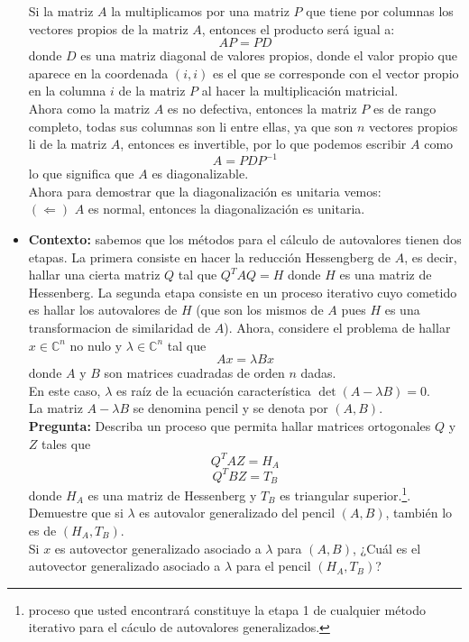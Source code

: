\documentclass{article}
\begin{document}
\begin{itemize}
Si la matriz $A$ la multiplicamos por una matriz $P$ que tiene por columnas los vectores propios de la matriz $A$, entonces el producto será igual a:
\[AP = PD\]
donde $D$ es una matriz diagonal de valores propios, donde el valor propio que aparece en la coordenada $(i,i)$ es el que se corresponde con el vector propio en la columna $i$ de la matriz $P$ al hacer la multiplicación matricial.\\

Ahora como la matriz $A$ es no defectiva, entonces la matriz $P$ es de rango completo, todas sus columnas son li entre ellas, ya que son $n$ vectores propios li de la matriz $A$, entonces es invertible, por lo que podemos escribir $A$ como 
\[A = PDP^{-1}\]
lo que significa que $A$ es diagonalizable.\\

Ahora para demostrar que la diagonalización es unitaria vemos:\\

\((\Leftarrow)\)
$A$ es normal, entonces la diagonalización es unitaria.

\item {\bf Contexto: } sabemos que los métodos para el cálculo de autovalores tienen dos etapas. La primera consiste en hacer la reducción Hessengberg de $A$, es decir, hallar una cierta matriz $Q$ tal que $Q^{T}AQ=H$ donde $H$ es una matriz de Hessenberg. La segunda etapa consiste en un proceso iterativo cuyo cometido es hallar los autovalores de $H$ (que son los mismos de $A$ pues $H$ es una transformacion de similaridad de $A$). Ahora, considere el problema de hallar $x\in \mathbb{C}^{n}$ no nulo y $\lambda \in \mathbb{C}^{n}$ tal que 
$$ Ax = \lambda Bx$$ 
donde $A$ y $B$ son matrices cuadradas de orden $n$ dadas.\\
En este caso, $\lambda$ es raíz de la ecuación característica $\det(A-\lambda B)=0$.\\

La matriz $A-\lambda B$ se denomina pencil y se denota por $(A, B)$.\\

{\bf Pregunta: } Describa un proceso que permita hallar matrices ortogonales $Q$ y $Z$ tales que 
$$Q^{T}AZ=H_{A}$$
$$Q^{T}BZ = T_{B}$$
donde $H_{A}$ es una matriz de Hessenberg y $T_{B}$ es triangular superior.\footnote{proceso que usted encontrará constituye la etapa 1 de cualquier método iterativo para el cáculo de autovalores generalizados.}.
Demuestre que si $\lambda$ es autovalor generalizado del pencil $(A, B)$, también lo es de $(H_{A}, T_{B})$.\\
Si $x$ es autovector generalizado asociado a $\lambda$ para $(A,B)$, ¿Cuál es el autovector generalizado asociado a $\lambda$ para el pencil $(H_{A}, T_{B})$?
\end{itemize}
\end{document}
